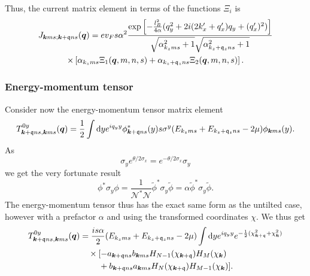 Thus, the current matrix element in terms of  the functions \( \Xi_i \) is
\begin{multline}
  J_{\bm{k} m s; \bm{k} + \mathfrak{q} n s} (\bm{q}) =
  e v_F s \alpha^2
  \frac{
    \exp \left[
      -\frac{l_{B}^2}{4 \alpha } (q_{y}^2 + 2i (2 k' _x + q' _x) q_{y} + (q'_x)^2 )
    \right]
  }{
    \sqrt{\alpha_{k_z m s}^2 + 1} \sqrt{\alpha_{k_z + \mathfrak{q}_z n s}^2 + 1}
  }\\
 \times \left[
     \alpha_{k_z m s} \Xi_1(\bm{q}, m, n, s) + \alpha_{k_z + \mathfrak{q}_z n s} \Xi_2(\bm{q}, m, n, s)
  \right].
\end{multline}

\subsubsection{Energy-momentum tensor}
Consider now the energy-momentum tensor matrix element
\begin{equation}
  \label{eq:106}
  T_{\bm{k} + \mathfrak{q} n s, \bm{k} m s}^{0y} (\bm{q}) =
  \frac{1}{2}
  \int \mathrm{d} y
  e^{i q_{y} y}
  \phi ^{*}_{\bm{k} + \mathfrak{q} n s}(y) s \sigma ^{y}
  (E_{k_z m  s} + E_{k_z+\mathfrak{q}_z n s} - 2 \mu)
  \phi _{\bm{k} m s} (y).
\end{equation}
As
\begin{equation}
  \label{eq:107}
  \sigma _{y} e^{\theta /2 \sigma _{x}} = e^{-\theta /2 \sigma _{x}} \sigma _{y}
\end{equation}
we get the very fortunate result
\begin{equation}
  \label{eq:108}
  \phi^{*} \sigma _{y} \phi
  = \frac{1}{\mathcal{N}^{*} \mathcal{N}} \tilde{\phi}^{*} \sigma _{y} \tilde{\phi}
  = \alpha \tilde{\phi}^{*} \sigma _{y} \tilde{\phi}.
\end{equation}
The energy-momentum tensor thus has the exact same form as the untilted case, however with a prefactor \( \alpha \) and using the transformed coordinates \( \chi \).
We thus get
\begin{align}
  T_{\bm{k}+\mathfrak{q} ns, \bm{k} m s}^{0y} (\bm{q}) &=
  \frac{is \alpha}{2} (E_{k_z m s} + E_{k_z + \mathfrak{q}_z n s} - 2 \mu)
  \int \mathrm{d} y
  e^{i q_{y} y}
  e^{-\frac{1}{2} (\chi_{\bm{k}+\mathfrak{q}}^2 + \chi_{\bm{k}} ^2) }\nonumber\\
  &\quad \times [
  -a_{\bm{k} + \mathfrak{q} ns} b_{\bm{k} m s} H_{N-1} (\chi_{\bm{k} + \mathfrak{q}}) H_{M} (\chi_{\bm{k}})\nonumber\\
  & \qquad\; + b_{\bm{k} + \mathfrak{q} n s} a_{\bm{k} ms} H_{N}(\chi_{\bm{k} + \mathfrak{q}}) H_{M-1} (\chi_{\bm{k}})
  ].\label{eq:109}
\end{align}
